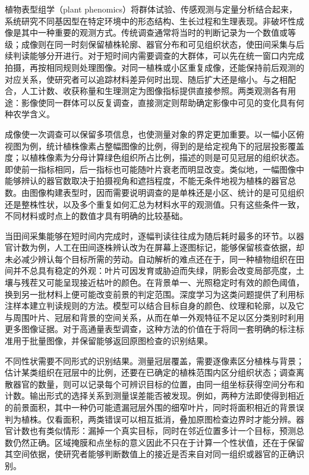 植物表型组学（plant phenomics）将群体试验、传感观测与定量分析结合起来，系统研究不同基因型在特定环境中的形态结构、生长过程和生理表现。非破坏性成像是其中一种重要的观测方式。传统调查通常将当时的判断记录为一个数值或等级；成像则在同一时刻保留植株轮廓、器官分布和可见组织状态，使田间采集与后续判读能够分开进行。对于短时间内需要调查的大群体，可以先在统一窗口内完成拍摄，再按相同规则处理图像。对同一植株或小区重复成像，还能保持前后观测的对应关系，使研究者可以追踪材料差异何时出现、随后扩大还是缩小。与之相配合，人工计数、收获称量和生理测定为图像指标提供直接参照。两类观测各有用途：影像使同一群体可以反复调查，直接测定则帮助确定影像中可见的变化具有何种农学含义。

成像使一次调查可以保留多项信息，也使测量对象的界定更加重要。以一幅小区俯视图为例，统计植株像素占整幅图像的比例，得到的是给定视角下的冠层投影覆盖度；以植株像素为分母计算绿色组织所占比例，描述的则是可见冠层的组织状态。即使前一指标相同，后一指标也可能随叶片衰老而明显改变。类似地，一幅图像中能够辨认的器官数取决于拍摄视角和遮挡程度，不能无条件地视为植株的器官总数。由图像构建表型时，因而需要说明调查的是单株还是小区、统计的是可见组织还是整株性状，以及多个重复如何汇总为材料水平的观测值。只有这些条件一致，不同材料或时点上的数值才具有明确的比较基础。

当田间采集能够在短时间内完成时，逐幅判读往往成为随后耗时最多的环节。以器官计数为例，人工在田间逐株辨认改为在屏幕上逐图标记，能够保留核查依据，却未必减少辨认每个目标所需的劳动。自动解析的难点还在于，同一种植物组织在田间并不总具有稳定的外观：叶片可因发育或胁迫而失绿，阴影会改变局部亮度，土壤与残茬又可能呈现接近枯叶的颜色。在背景单一、光照稳定时有效的颜色阈值，换到另一批材料上便可能改变前景的判定范围。深度学习为这类问题提供了利用标注样本建立判读规则的方法。模型可以结合目标自身的颜色、纹理和轮廓，以及它与周围叶片、冠层和背景的空间关系，从而在单一外观特征不足以区分类别时利用更多图像证据。对于高通量表型调查，这种方法的价值在于将同一套明确的标注标准用于批量图像，并保留能够返回原图检查的识别结果。

不同性状需要不同形式的识别结果。测量冠层覆盖，需要逐像素区分植株与背景；估计某类组织在冠层中的比例，还要在已确定的植株范围内区分组织状态；调查离散器官的数量，则可以记录每个可辨识目标的位置，由同一组坐标获得空间分布和计数。输出形式的选择关系到测量误差能否被发现。例如，两种方法即使得到相近的前景面积，其中一种仍可能遗漏冠层外围的细窄叶片，同时将面积相近的背景误判为植株。仅看面积，两类错误可以相互抵消，叠加原图检查边界时才能分辨。器官计数也有类似情形：漏掉一个真实目标，同时在邻近位置多计一个目标，预测总数仍然正确。区域掩膜和点坐标的意义因此不只在于计算一个性状值，还在于保留其空间依据，使研究者能够判断数值上的接近是否来自对同一组织或器官的正确识别。

